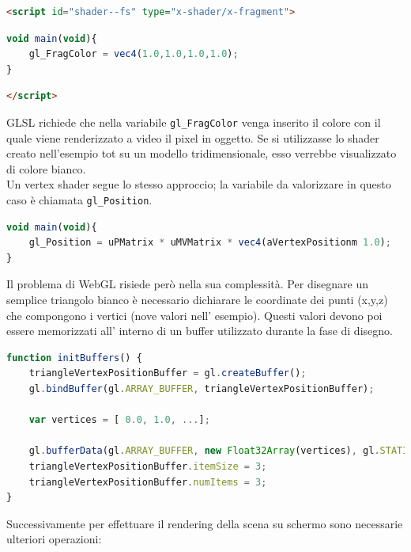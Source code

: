 \begin{lstlisting}[language=html]
<script id="shader--fs" type="x-shader/x-fragment">
\end{lstlisting}
\begin{lstlisting}[language=javascript]
void main(void){
	gl_FragColor = vec4(1.0,1.0,1.0,1.0);
}
\end{lstlisting}
\begin{lstlisting}[language=html]
</script>
\end{lstlisting}

GLSL richiede che nella variabile \texttt{gl\_FragColor} venga inserito il colore con il quale viene renderizzato a video il pixel in oggetto. Se si utilizzasse lo shader creato nell’esempio tot su un modello tridimensionale, esso verrebbe visualizzato di colore bianco.
\\
Un vertex shader segue lo stesso approccio; la variabile da valorizzare in questo caso è chiamata \texttt{gl\_Position}.

\begin{lstlisting}[language=javascript]
void main(void){
	gl_Position = uPMatrix * uMVMatrix * vec4(aVertexPositionm 1.0);
}
\end{lstlisting}

Il problema di WebGL risiede però nella sua complessità.
Per disegnare un semplice triangolo bianco è necessario dichiarare le coordinate dei punti (x,y,z) che compongono i vertici (nove valori nell’ esempio).
Questi valori devono poi essere memorizzati all’ interno di un buffer utilizzato durante la fase di disegno.

\begin{lstlisting}[language=javascript]
function initBuffers() {
	triangleVertexPositionBuffer = gl.createBuffer();
	gl.bindBuffer(gl.ARRAY_BUFFER, triangleVertexPositionBuffer);

	var vertices = [ 0.0, 1.0, ...];

	gl.bufferData(gl.ARRAY_BUFFER, new Float32Array(vertices), gl.STATIC_DRAW);
	triangleVertexPositionBuffer.itemSize = 3;
	triangleVertexPositionBuffer.numItems = 3;
}
\end{lstlisting}
Successivamente per effettuare il rendering della scena su schermo sono necessarie ulteriori operazioni:

